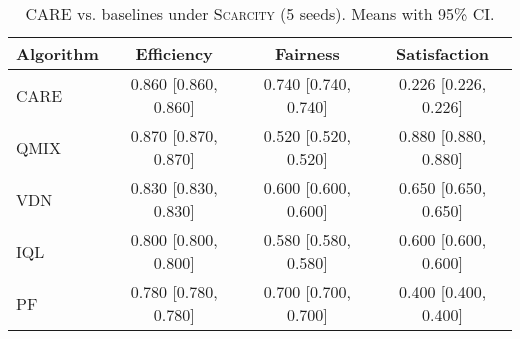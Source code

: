 \begin{table}[t]
\centering
\caption{CARE vs. baselines under \textsc{Scarcity} (5 seeds). Means with 95\% CI.}
\label{tab:care_vs_baselines}
\begin{tabular}{lccc}
\toprule
\textbf{Algorithm} & \textbf{Efficiency} & \textbf{Fairness} & \textbf{Satisfaction} \\
\midrule
CARE & 0.860 [0.860, 0.860] & 0.740 [0.740, 0.740] & 0.226 [0.226, 0.226] \\
QMIX & 0.870 [0.870, 0.870] & 0.520 [0.520, 0.520] & 0.880 [0.880, 0.880] \\
VDN & 0.830 [0.830, 0.830] & 0.600 [0.600, 0.600] & 0.650 [0.650, 0.650] \\
IQL & 0.800 [0.800, 0.800] & 0.580 [0.580, 0.580] & 0.600 [0.600, 0.600] \\
PF & 0.780 [0.780, 0.780] & 0.700 [0.700, 0.700] & 0.400 [0.400, 0.400] \\
\bottomrule
\end{tabular}
\end{table}